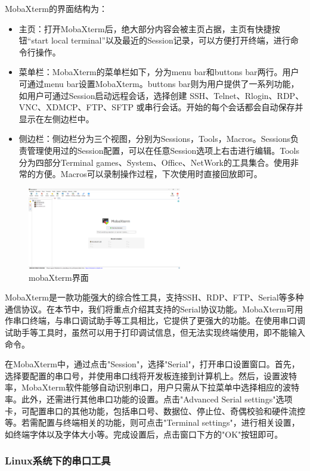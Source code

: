 MobaXterm的界面结构为：
\begin{itemize}
	\item 主页：打开MobaXterm后，绝大部分内容会被主页占据，主页有快捷按钮“start local terminal”以及最近的Session记录，可以方便打开终端，进行命令行操作。
	\item 菜单栏：MobaXterm的菜单栏如下，分为menu bar和buttons bar两行。用户可通过menu bar设置MobaXterm。buttons bar则为用户提供了一系列功能，如用户可通过Session启动远程会话，选择创建 SSH、Telnet、Rlogin、RDP、VNC、XDMCP、FTP、SFTP 或串行会话。开始的每个会话都会自动保存并显示在左侧边栏中。
	\item 侧边栏：侧边栏分为三个视图，分别为Sessions，Tools，Macros。Sessions负责管理使用过的Session配置，可以在任意Session选项上右击进行编辑。Tools分为四部分Terminal games、System、Office、NetWork的工具集合。使用非常的方便。Macros可以录制操作过程，下次使用时直接回放即可。
\end{itemize}

\begin{figure}[h]
	\centering
	\includegraphics[width=0.6\textwidth]{figures/08-01-mobaXterm界面.png}
	\caption{mobaXterm界面}
	\label{mobaXterm界面}
\end{figure}


MobaXterm是一款功能强大的综合性工具，支持SSH、RDP、FTP、Serial等多种通信协议。在本节中，我们将重点介绍其支持的Serial协议功能。MobaXterm可用作串口终端，与串口调试助手等工具相比，它提供了更强大的功能。在使用串口调试助手等工具时，虽然可以用于打印调试信息，但无法实现终端使用，即不能输入命令。


在MobaXterm中，通过点击"Session"，选择"Serial"，打开串口设置窗口。首先，选择要配置的串口号，并使用串口线将开发板连接到计算机上。然后，设置波特率，MobaXterm软件能够自动识别串口，用户只需从下拉菜单中选择相应的波特率。此外，还需进行其他串口功能的设置。点击"Advanced Serial settings"选项卡，可配置串口的其他功能，包括串口号、数据位、停止位、奇偶校验和硬件流控等。若需配置与终端相关的功能，则可点击"Terminal settings"，进行相关设置，如终端字体以及字体大小等。完成设置后，点击窗口下方的"OK"按钮即可。

\subsubsection{Linux系统下的串口工具}


